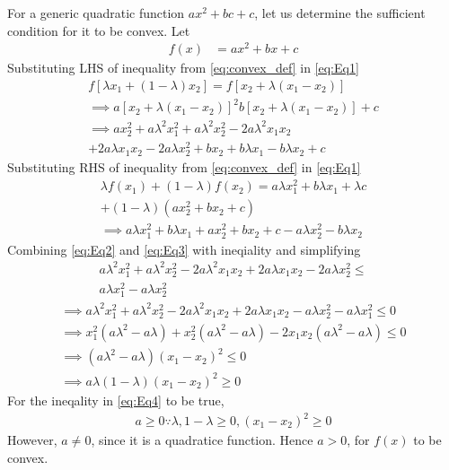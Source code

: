 \documentclass[12pt]{article}
\providecommand{\brak}[1]{\ensuremath{\left(#1\right)}}
\providecommand{\sbrak}[1]{\ensuremath{{}\left[#1\right]}}
\begin{document}
\begin{enumerate}
For a generic quadratic function $ax^2+bc+c$, let us determine the sufficient condition for it to be convex. Let 
\begin{align}
	\label{eq:Eq1}
	f\brak{x} &= ax^2+bx+c 
\end{align}
Substituting LHS of inequality from \eqref{eq:convex_def} in \eqref{eq:Eq1}
\begin{multline}
   \label{eq:Eq2}
	f\sbrak{\lambda x_1 + \brak{1-\lambda}x_2}  = f\sbrak{x_2 + \lambda \brak{x_1-x_2}}\\ 
	   \implies  a\sbrak{x_2+\lambda\brak{x_1-x_2}}^2 b\sbrak{x_2+\lambda\brak{x_1-x_2}} + c \\ 
	   \implies ax_2^2 + a\lambda^2 x_1^2+a\lambda^2 x_2^2 - 2a\lambda^2 x_1x_2 \\ 
	   +2a\lambda x_1x_2 - 2a\lambda x_2^2+bx_2+b\lambda x_1-b\lambda x_2+c 
\end{multline} 
Substituting RHS of inequality from \eqref{eq:convex_def} in \eqref{eq:Eq1}
\begin{multline}
	\lambda f\brak{x_1} + \brak{1-\lambda}f\brak{x_2}  = a \lambda x_1^2 + b\lambda x_1 + \lambda c \\ 
		 + \brak{1-\lambda}\brak{ax_2^2+bx_2+c} \\
	\label{eq:Eq3}
		\implies  a \lambda x_1^2 + b\lambda x_1 + ax_2^2 + bx_2 + c -a\lambda x_2^2 -b\lambda x_2
\end{multline} 
Combining \eqref{eq:Eq2} and \eqref{eq:Eq3} with ineqiality and simplifying
\begin{multline}
a\lambda^2 x_1^2 + a\lambda^2 x_2^2 - 2a\lambda^2 x_1x_2 +2a\lambda x_1x_2 - 2a\lambda x_2^2 \leq \\
	a\lambda x_1^2  -a\lambda x_2^2  
\end{multline} 
\begin{multline}
	\label{eq:Eq4}
	\implies a\lambda^2 x_1^2 + a\lambda^2 x_2^2 - 2a\lambda^2 x_1x_2 +2a\lambda x_1x_2 - a\lambda x_2^2 - a\lambda x_1^2 \leq 0 \\ 
	\implies   x_1^2\brak{a\lambda^2-a\lambda} + x_2^2\brak{a\lambda^2 - a\lambda} - 2x_1x_2\brak{a\lambda^2-a\lambda} \leq 0 \\ 
	 \implies  \brak{a \lambda^2-a\lambda}\brak{x_1-x_2}^2 \leq 0\\
	 \implies  a\lambda\brak{1-\lambda}\brak{x_1-x_2}^2 \geq 0
\end{multline}
For the ineqality in \eqref{eq:Eq4} to be true,
\begin{align}
	a \geq 0 \because \lambda, 1-\lambda \geq 0, \brak{x_1-x_2}^2 \geq 0
\end{align}
However, $a \neq 0$, since it is a quadratice function. Hence $a > 0$, for $f\brak{x}$ to be convex.


\end{enumerate}
\end{document}
